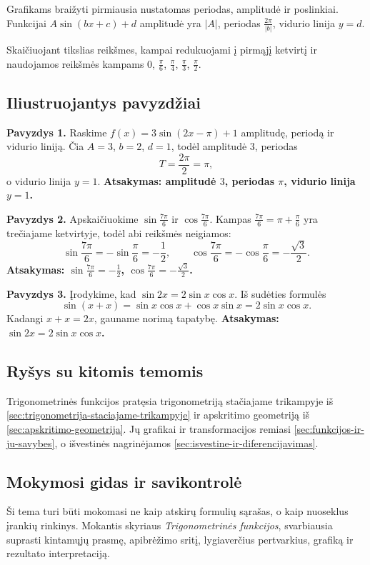 Grafikams braižyti pirmiausia nustatomas periodas, amplitudė ir poslinkiai. Funkcijai $A\sin(bx+c)+d$ amplitudė yra $|A|$, periodas $\frac{2\pi}{|b|}$, vidurio linija $y=d$.

Skaičiuojant tikslias reikšmes, kampai redukuojami į pirmąjį ketvirtį ir naudojamos reikšmės kampams $0$, $\frac{\pi}{6}$, $\frac{\pi}{4}$, $\frac{\pi}{3}$, $\frac{\pi}{2}$.

\subsection{Iliustruojantys pavyzdžiai}

\textbf{Pavyzdys 1.} Raskime $f(x)=3\sin(2x-\pi)+1$ amplitudę, periodą ir vidurio liniją. Čia $A=3$, $b=2$, $d=1$, todėl amplitudė $3$, periodas
\[
T=\frac{2\pi}{2}=\pi,
\]
o vidurio linija $y=1$. \textbf{Atsakymas: amplitudė $3$, periodas $\pi$, vidurio linija $y=1$.}

\textbf{Pavyzdys 2.} Apskaičiuokime $\sin\frac{7\pi}{6}$ ir $\cos\frac{7\pi}{6}$. Kampas $\frac{7\pi}{6}=\pi+\frac{\pi}{6}$ yra trečiajame ketvirtyje, todėl abi reikšmės neigiamos:
\[
\sin\frac{7\pi}{6}=-\sin\frac{\pi}{6}=-\frac12,\qquad
\cos\frac{7\pi}{6}=-\cos\frac{\pi}{6}=-\frac{\sqrt3}{2}.
\]
\textbf{Atsakymas: $\sin\frac{7\pi}{6}=-\frac12$, $\cos\frac{7\pi}{6}=-\frac{\sqrt3}{2}$.}

\textbf{Pavyzdys 3.} Įrodykime, kad $\sin 2x=2\sin x\cos x$. Iš sudėties formulės
\[
\sin(x+x)=\sin x\cos x+\cos x\sin x=2\sin x\cos x.
\]
Kadangi $x+x=2x$, gauname norimą tapatybę. \textbf{Atsakymas: $\sin 2x=2\sin x\cos x$.}

\subsection{Ryšys su kitomis temomis}

Trigonometrinės funkcijos pratęsia trigonometriją stačiajame trikampyje iš \ref{sec:trigonometrija-staciajame-trikampyje} ir apskritimo geometriją iš \ref{sec:apskritimo-geometrija}. Jų grafikai ir transformacijos remiasi \ref{sec:funkcijos-ir-ju-savybes}, o išvestinės nagrinėjamos \ref{sec:isvestine-ir-diferencijavimas}.

\subsection{Mokymosi gidas ir savikontrolė}

Ši tema turi būti mokomasi ne kaip atskirų formulių sąrašas, o kaip nuoseklus įrankių rinkinys. Mokantis skyriaus \textit{Trigonometrinės funkcijos}, svarbiausia suprasti kintamųjų prasmę, apibrėžimo sritį, lygiaverčius pertvarkius, grafiką ir rezultato interpretaciją.

